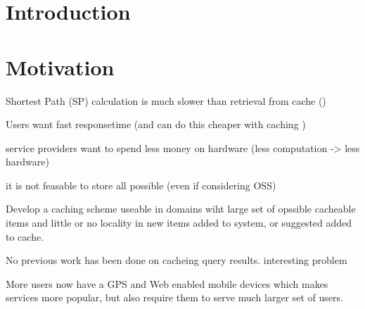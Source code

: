 \section{Introduction} \label{sec:intro}

\section{Motivation}
Shortest Path (SP) calculation is much slower than retrieval from cache ()

Users want fast responsetime (and \spath can do this cheaper with caching \cite{ref.})

\spath service providers want to spend less money on hardware (less computation -> less hardware)

it is not feasable to store all possible \spaths (even if considering OSS)

Develop a caching scheme useable in domains wiht large set of opssible cacheable items and little or no  locality in new items added to system, or suggested added to cache.

No previous work has been done on cacheing \spath query results. interesting problem

More users now have a GPS and Web enabled mobile devices which makes \spath services more popular, but also require them to serve much larger set of users.








% 
% 


